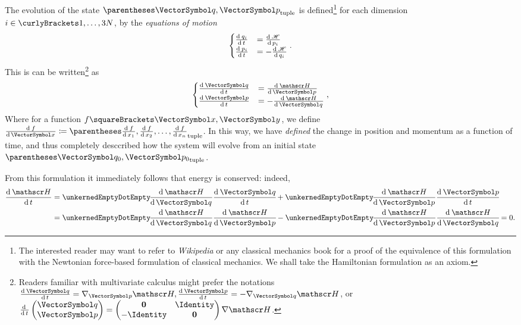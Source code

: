 \documentclass[10pt, a4paper, twoside]{basestyle}
\begin{document}
The evolution of the state $\tuple{\vq, \vp}$ is defined\footnote{The interested
reader may want to refer to \emph{Wikipedia} or any classical mechanics book for
a proof of the equivalence of this formulation with the Newtonian force-based
formulation of classical mechanics. We shall take the Hamiltonian formulation as
an axiom.} for each dimension $i\in\set{1,\dotsc,3N}$, by the \emph{equations of
motion}
\[
\begin{cases}
\deriv t {q_i} &= \deriv {p_i} \Hamiltonian \\
\deriv t {p_i} &= -\deriv {q_i} \Hamiltonian
\end{cases}.
\]
This is can be written\footnote{Readers familiar with multivariate calculus
might prefer the notations $\deriv t {\vq} = \grad_{\vp} \Hamiltonian,
\deriv t {\vp} = -\grad_{\vq} \Hamiltonian$, or $\derivop t 
\begin{pmatrix}
\vq \\
\vp
\end{pmatrix} =
\begin{pmatrix}
\nullmat    & \Identity \\
-\Identity & \nullmat
\end{pmatrix}
\grad \Hamiltonian$.}
as
\[
\begin{cases}
\deriv t {\vq} &= \deriv {\vp} \Hamiltonian \\
\deriv t {\vp} &= -\deriv {\vq} \Hamiltonian
\end{cases},
\]
Where for a function $f\of{\vx, \vy}$, we define $\deriv \vx f\DefineAs
\tuple{\deriv {x_1} f, \deriv {x_2} f, \dotsc, \deriv {x_n} f}$.
In this way, we have \emph{defined} the change in position and momentum as a
function of time, and thus completely desccribed how the system will evolve from
an initial state $\tuple{\vq_0, \vp_0}$.

From this formulation it immediately follows that energy is conserved:
indeed,
\begin{align*}
\deriv t \Hamiltonian &= \scal{\deriv \vq \Hamiltonian}{\deriv t \vq}
    + \scal{\deriv \vp \Hamiltonian}{\deriv t \vp} \\
&= \scal{\deriv \vq \Hamiltonian}{\deriv \vp \Hamiltonian}
    - \scal{\deriv \vp \Hamiltonian}{\deriv \vq \Hamiltonian} = 0.
\end{align*}
\end{document}
